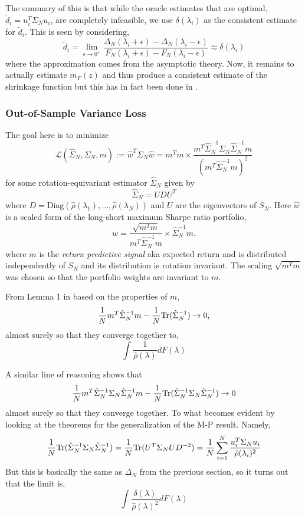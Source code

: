 \documentclass{article}
\begin{document}
The summary of this is that while the oracle estimates that are optimal,
$\tilde{d}_i = u_i^T \Sigma_N u_i$, are completely infeasible, we use
$\delta(\lambda_i)$ as the consistent estimate for $\tilde{d}_i$. This is seen
by considering,
$$
	\tilde{d}_i = \lim_{\epsilon \rightarrow 0^+} 
		\frac{\Delta_N(\lambda_i + \epsilon) - \Delta_N(\lambda_i - \epsilon)}
			{F_N(\lambda_i + \epsilon) - F_N(\lambda_i - \epsilon)}
		\approx \delta(\lambda_i)
$$
where the approximation comes from the asymptotic theory.  Now, it remains to
actually estimate $m_F(z)$ and thus produce a consistent estimate of the
shrinkage function but this has in fact been done in \cite{Ledoit2015Spectrum}.


\subsubsection{Out-of-Sample Variance Loss}\label{sec:oos_var_loss}

The goal here is to minimize
$$
	\mathcal{L}(\hat{\Sigma}_N, \Sigma_N, m)
		:= \hat{w}^T \Sigma_N \hat{w}
		 = m^Tm \times \frac
		 	{m^T \hat{\Sigma}_N^{-1} \Sigma_N \hat{\Sigma}_N^{-1} m}
		 	{\left(m^T \hat{\Sigma}_N^{-1} m\right)^2}
$$
for some rotation-equivariant estimator $\hat{\Sigma}_N$ given by 
$$
	\hat{\Sigma}_N = U D U^T
$$
where $D = \mathrm{Diag}(\hat{\rho}(\lambda_1), \ldots,
\hat{\rho}(\lambda_N))$ and $U$ are the eigenvectors of $S_N$.  Here $\hat{w}$
is a scaled form of the long-short maximum Sharpe ratio portfolio,
$$
	\hat{w} 
		= \frac{\sqrt{ m^Tm }}{m^T \hat{\Sigma}_N^{-1} m} \times \hat{\Sigma}_N^{-1} m.
$$
where $m$ is the \emph{return predictive signal} aka expected return and is
distributed independently of $S_N$ and its distribution is rotation invariant.
The scaling $\sqrt{ m^Tm }$ was chosen so that the portfolio weights are
invariant to $m$.

From Lemma 1 in \cite{Ledoit2011Eigenvectors} based on the properties of $m$,
$$
	\frac1N m^T \hat{\Sigma}_N^{-1} m 
		- \frac1N \mathrm{Tr}(\hat{\Sigma}_N^{-1}) \rightarrow 0,
$$
almost surely so that they converge together to,
$$
	\int \frac{1}{\hat{\rho}(\lambda)}dF(\lambda)
$$

A similar line of reasoning shows that 
$$
	\frac1N m^T \hat{\Sigma}_N^{-1} \Sigma_N \hat{\Sigma}_N^{-1} m
		- \frac1N \mathrm{Tr}(\hat{\Sigma}_N^{-1} \Sigma_N \hat{\Sigma}_N^{-1})
		\rightarrow 0
$$
almost surely so that they converge together.  To what becomes evident by
looking at the theorems for the generalization of the M-P result.  Namely,
$$
	\frac1N \mathrm{Tr}(\hat{\Sigma}_N^{-1} \Sigma_N \hat{\Sigma}_N^{-1})
		 = \frac1N \mathrm{Tr}(U^T \Sigma_N U D^{-2})
		 = \frac1N \sum_{i=1}^N \frac{u_i^T \Sigma_N u_i}{\hat{\rho}(\lambda_i)^2}
$$
But this is basically the same as $\Delta_N$ from the previous section, so it
turns out that the limit is,
$$
	\int \frac{\delta(\lambda)}{\hat{\rho}(\lambda)^2}dF(\lambda)
$$
\end{document}
